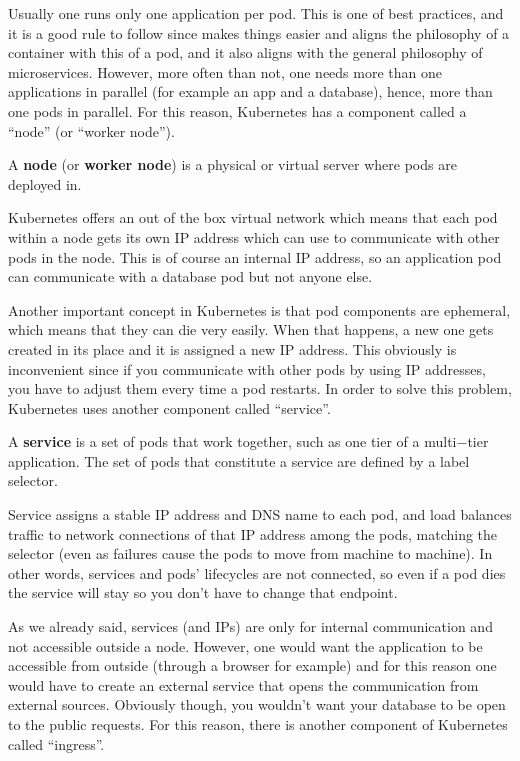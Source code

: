 Usually one runs only one application per pod. This is one of best practices, and it is a good rule to follow since
makes things easier and aligns the philosophy of a container with this of a pod, and it also aligns with the general
philosophy of microservices. However, more often than not, one needs more than one applications in parallel (for
example an app and a database), hence, more than one pods in parallel. For this reason, Kubernetes has a component
called a ``node'' (or ``worker node'').

A \textbf{node} (or \textbf{worker node}) is a physical or virtual server where pods are deployed in.
\ed


Kubernetes offers an out of the box virtual network which means that each pod within a node gets its own IP address
which can use to communicate with other pods in the node. This is of course an internal IP address, so an application
pod can communicate with a database pod but not anyone else.


Another important concept in Kubernetes is that pod components are ephemeral, which means that they can die very
easily. When that happens, a new one gets created in its place and it is assigned a new IP address. This obviously is
inconvenient since if you communicate with other pods by using IP addresses, you have to adjust them every time a pod
restarts. In order to solve this problem, Kubernetes uses another component called ``service''.

\bd[Service]
A \textbf{service} is a set of pods that work together, such as one tier of a multi$-$tier application. The set of
pods that constitute a service are defined by a label selector.
\ed

Service assigns a stable IP address and DNS name to each pod, and load balances traffic to network connections of
that IP address among the pods, matching the selector (even as failures cause the pods to move from machine to
machine). In other words, services and pods' lifecycles are not connected, so even if a pod dies the service will
stay so you don't have to change that endpoint.


As we already said, services (and IPs) are only for internal communication and not accessible outside a node.
However, one would want the application to be accessible from outside (through a browser for example) and for this
reason one would have to create an external service that opens the communication from external sources. Obviously
though, you wouldn't want your database to be open to the public requests. For this reason, there is another
component of Kubernetes called ``ingress''.

